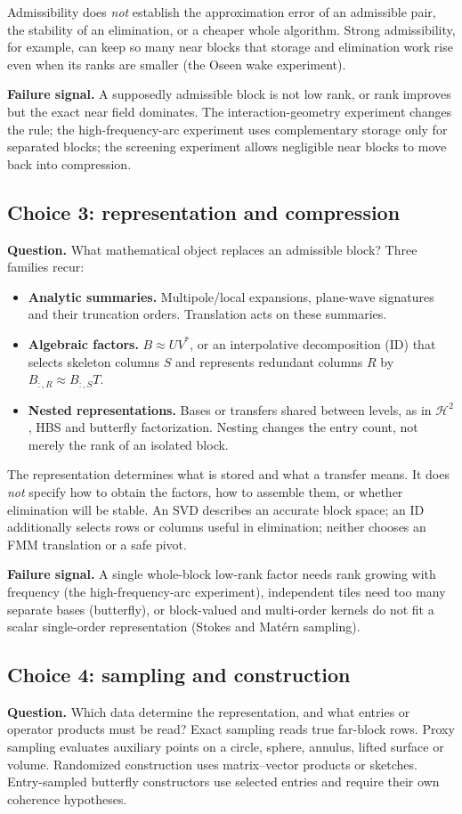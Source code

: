 Admissibility does \emph{not} establish the approximation error of an admissible pair, the stability of an elimination, or a cheaper whole algorithm. Strong admissibility, for example, can keep so many near blocks that storage and elimination work rise even when its ranks are smaller (the Oseen wake experiment).

\textbf{Failure signal.} A supposedly admissible block is not low rank, or rank improves but the exact near field dominates. The interaction-geometry experiment changes the rule; the high-frequency-arc experiment uses complementary storage only for separated blocks; the screening experiment allows negligible near blocks to move back into compression.

\subsection{Choice 3: representation and compression}
\textbf{Question.} What mathematical object replaces an admissible block? Three families recur:
\begin{itemize}
 \item \textbf{Analytic summaries.} Multipole/local expansions, plane-wave signatures and their truncation orders. Translation acts on these summaries.
 \item \textbf{Algebraic factors.} $B\approx UV^*$, or an interpolative decomposition (ID) that selects skeleton columns $S$ and represents redundant columns $R$ by $B_{:,R}\approx B_{:,S}T$.
 \item \textbf{Nested representations.} Bases or transfers shared between levels, as in $\mathcal H^2$, HBS and butterfly factorization. Nesting changes the entry count, not merely the rank of an isolated block.
\end{itemize}
The representation determines what is stored and what a transfer means. It does \emph{not} specify how to obtain the factors, how to assemble them, or whether elimination will be stable. An SVD describes an accurate block space; an ID additionally selects rows or columns useful in elimination; neither chooses an FMM translation or a safe pivot.

\textbf{Failure signal.} A single whole-block low-rank factor needs rank growing with frequency (the high-frequency-arc experiment), independent tiles need too many separate bases (butterfly), or block-valued and multi-order kernels do not fit a scalar single-order representation (Stokes and Matérn sampling).

\subsection{Choice 4: sampling and construction}
\textbf{Question.} Which data determine the representation, and what entries or operator products must be read? Exact sampling reads true far-block rows. Proxy sampling evaluates auxiliary points on a circle, sphere, annulus, lifted surface or volume. Randomized construction uses matrix--vector products or sketches. Entry-sampled butterfly constructors use selected entries and require their own coherence hypotheses.

